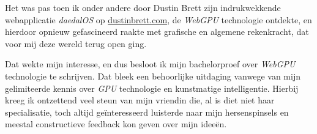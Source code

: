 \bigbreak{}

Het was pas toen ik onder andere door Dustin Brett zijn indrukwekkende webapplicatie \textit{daedalOS} op \href{https://dustinbrett.com/}{dustinbrett.com}, de \textit{WebGPU} technologie ontdekte, en hierdoor opnieuw gefascineerd raakte met grafische en algemene rekenkracht, dat voor mij deze wereld terug open ging.

\bigbreak{}

Dat wekte mijn interesse, en dus besloot ik mijn bachelorproef over \textit{WebGPU} technologie te schrijven. Dat bleek een behoorlijke uitdaging vanwege van mijn gelimiteerde kennis over \textit{GPU} technologie en kunstmatige intelligentie. Hierbij kreeg ik ontzettend veel steun van mijn vriendin die, al is diet niet haar specialisatie, toch altijd geïnteresseerd luisterde naar mijn hersenspinsels en meestal constructieve feedback kon geven over mijn ideeën.